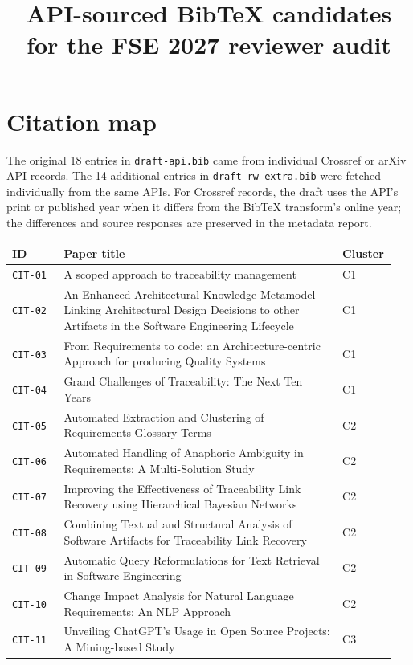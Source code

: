 \documentclass{article}
\title{API-sourced BibTeX candidates for the FSE 2027 reviewer audit}
\author{}
\date{}
\begin{document}
\maketitle

\section*{Citation map}
The original 18 entries in \texttt{draft-api.bib} came from individual
Crossref or arXiv API records. The 14 additional entries in
\texttt{draft-rw-extra.bib} were fetched individually from the same APIs.
For Crossref records, the draft uses the API's print or published year when
it differs from the BibTeX transform's online year; the differences and
source responses are preserved in the metadata report.

\begin{longtable}{p{0.13\linewidth}p{0.70\linewidth}p{0.12\linewidth}}
\toprule
\textbf{ID} & \textbf{Paper title} & \textbf{Cluster} \\
\midrule
\endhead
\texttt{CIT-01} & A scoped approach to traceability management & C1 \\
\texttt{CIT-02} & An Enhanced Architectural Knowledge Metamodel Linking Architectural Design Decisions to other Artifacts in the Software Engineering Lifecycle & C1 \\
\texttt{CIT-03} & From Requirements to code: an Architecture-centric Approach for producing Quality Systems & C1 \\
\texttt{CIT-04} & Grand Challenges of Traceability: The Next Ten Years & C1 \\
\texttt{CIT-05} & Automated Extraction and Clustering of Requirements Glossary Terms & C2 \\
\texttt{CIT-06} & Automated Handling of Anaphoric Ambiguity in Requirements: A Multi-Solution Study & C2 \\
\texttt{CIT-07} & Improving the Effectiveness of Traceability Link Recovery using Hierarchical Bayesian Networks & C2 \\
\texttt{CIT-08} & Combining Textual and Structural Analysis of Software Artifacts for Traceability Link Recovery & C2 \\
\texttt{CIT-09} & Automatic Query Reformulations for Text Retrieval in Software Engineering & C2 \\
\texttt{CIT-10} & Change Impact Analysis for Natural Language Requirements: An NLP Approach & C2 \\
\texttt{CIT-11} & Unveiling ChatGPT’s Usage in Open Source Projects: A Mining-based Study & C3 \\

\end{longtable}
\end{document}

